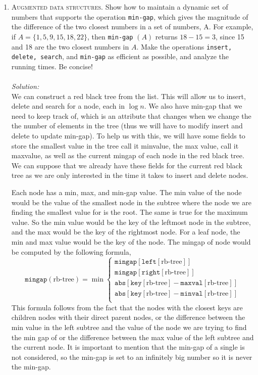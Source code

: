 \documentclass[12pt]{article}
\theoremstyle{definition}
\theoremstyle{remark}
\newcommand\sol{%
  \\ 
  \\
  \textit{Solution:}\\%
}
\begin{document}
\begin{enumerate}
\begin{algorithm}
  \end{algorithm}
 \newpage 
  \item \textsc{Augmented data structures.} Show how to maintain a dynamic set of numbers that
supports the operation \texttt{min-gap}, which gives the magnitude of the difference of the two closest numbers in a set of numbers, A. For example, if $A = \{1, 5, 9, 15, 18, 22\}$, then \texttt{min-gap} $(A)$ returns $18 - 15 = 3$, since 15 and 18 are the two closest numbers in $A$. Make the operations \texttt{insert, delete, search}, and \texttt{min-gap} as efficient as possible, and analyze the running times. Be concise! 
\sol

We can construct a red black tree from the list. This will allow us to insert, delete and search for a node, each in $\log n$. We also have min-gap that we need to keep track of, which is an attribute that changes when we change the the number of elements in the tree (thus we will have to modify insert and delete to update min-gap). To help us with this, we will have some fields to store the smallest value in the tree call it minvalue, the max value, call it maxvalue, as well as the current mingap of each node in the red black tree. We can suppose that we already have these fields for the current red black tree as we are only interested in the time it takes to insert and delete nodes. 

Each node has a min, max, and min-gap value. The min value of the node would be the value of the smallest node in the subtree where the node we are finding the smallest value for is the root. The same is true for the maximum value. So the min value would be the key of the leftmost node in the subtree, and the max would be the key of the rightmost node. For a leaf node, the min and max value would be the key of the node. The mingap of node would be computed by the following formula, 
\[\texttt{mingap}(\text{rb-tree}) = \min
\begin{cases}
    \texttt{mingap}[\texttt{left}[\text{rb-tree}]] \\
    \texttt{mingap}[\texttt{right}[\text{rb-tree}]] \\
    \texttt{abs}[\texttt{key}[\text{rb-tree}] - \texttt{maxval}[\text{rb-tree}]] \\
    \texttt{abs}[\texttt{key}[\text{rb-tree}] - \texttt{minval}[\text{rb-tree}]] \\
\end{cases}
\]
This formula follows from the fact that the nodes with the closest keys are children nodes with their direct parent nodes, or the difference between the min value in the left subtree and the value of the node we are trying to find the min gap of or the difference between the max value of the left subtree and the current node. It is important to mention that the min-gap of a single is not considered, so the min-gap is set to an infinitely big number so it is never the min-gap. 


\end{enumerate}
\end{document}

